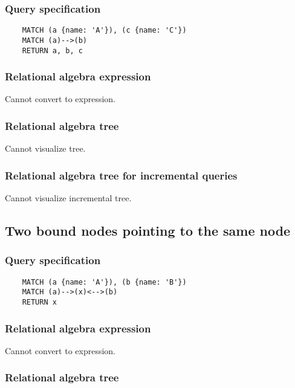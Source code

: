 	\subsubsection*{Query specification}

	\begin{lstlisting}
	MATCH (a {name: 'A'}), (c {name: 'C'})
	MATCH (a)-->(b)
	RETURN a, b, c
	\end{lstlisting}


	\subsubsection*{Relational algebra expression}

	Cannot convert to expression.

	\subsubsection*{Relational algebra tree}

	Cannot visualize tree.

	\subsubsection*{Relational algebra tree for incremental queries}

	Cannot visualize incremental tree.
	\subsection{Two bound nodes pointing to the same node}

	\subsubsection*{Query specification}

	\begin{lstlisting}
	MATCH (a {name: 'A'}), (b {name: 'B'})
	MATCH (a)-->(x)<-->(b)
	RETURN x
	\end{lstlisting}


	\subsubsection*{Relational algebra expression}

	Cannot convert to expression.

	\subsubsection*{Relational algebra tree}

